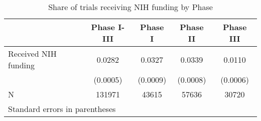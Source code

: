 \begin{table}[htbp]\centering
\caption{Share of trials receiving NIH funding by Phase}
\begin{tabular}{l*{4}{c}}
\hline\hline
                    &\multicolumn{1}{c}{Phase I-III}&\multicolumn{1}{c}{Phase I}&\multicolumn{1}{c}{Phase II}&\multicolumn{1}{c}{Phase III}\\
\hline
Received NIH funding&      0.0282&      0.0327&      0.0339&      0.0110\\
                    &    (0.0005)&    (0.0009)&    (0.0008)&    (0.0006)\\
\hline
N                   &      131971&       43615&       57636&       30720\\
\hline\hline
\multicolumn{5}{l}{\footnotesize Standard errors in parentheses}\\
\end{tabular}
\end{table}
